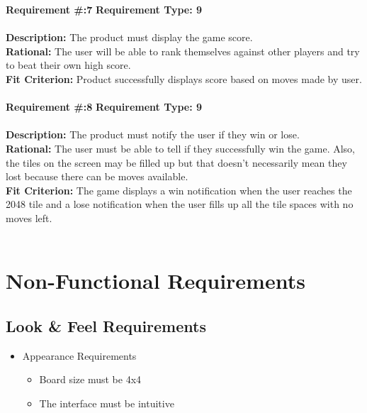 \textbf {Requirement \#:7} \indent\textbf {Requirement Type: 9} \\\\
\textbf {Description:} The product must display the game score.\\
\textbf {Rational:} The user will be able to rank themselves against other players and try to beat their own high 
score.\\
\textbf {Fit Criterion:} Product successfully displays score based on moves made by user.\\\\

\textbf {Requirement \#:8} \indent\textbf {Requirement Type: 9} \\\\
\textbf {Description:} The product must notify the user if they win or 
lose.\\
\textbf {Rational:} The user must be able to tell if they successfully win the game. Also, the tiles on the screen 
may be filled up but that doesn't necessarily mean they lost because there can be moves available. \\
\textbf {Fit Criterion:} The game displays a win notification when the user reaches the 2048 tile and a lose 
notification when the user fills up all the tile spaces with no moves left. \\\\

\section{Non-Functional Requirements}

\subsection{Look \& Feel Requirements}
\begin{itemize}
\item Appearance Requirements
\begin{itemize} 
\item Board size must be 4x4
\item The interface must be intuitive
\end{itemize}
\end{itemize}
